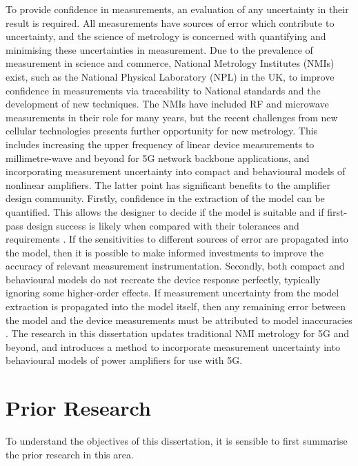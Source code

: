 \documentclass[../thesis/thesis.tex]{subfiles}
\begin{document}
\begin{refsection}
To provide confidence in measurements, an evaluation of any uncertainty in their result is required. All measurements have sources of error which contribute to uncertainty, and the science of metrology is concerned with quantifying and minimising these uncertainties in measurement. Due to the prevalence of measurement in science and commerce, National Metrology Institutes (NMIs) exist, such as the National Physical Laboratory (NPL) in the UK, to improve confidence in measurements via traceability to National standards and the development of new techniques. The NMIs have included RF and microwave measurements in their role for many years, but the recent challenges from new cellular technologies presents further opportunity for new metrology. This includes increasing the upper frequency of linear device measurements to millimetre-wave and beyond for 5G network backbone applications, and incorporating measurement uncertainty into compact and behavioural models of nonlinear amplifiers. The latter point has significant benefits to the amplifier design community. Firstly, confidence in the extraction of the model can be quantified. This allows the designer to decide if the model is suitable and if first-pass design success is likely when compared with their tolerances and requirements \cite{Williams_2016B}. If the sensitivities to different sources of error are propagated into the model, then it is possible to make informed investments to improve the accuracy of relevant measurement instrumentation. Secondly, both compact and behavioural models do not recreate the device response perfectly, typically ignoring some higher-order effects. If measurement uncertainty from the model extraction is propagated into the model itself, then any remaining error between the model and the device measurements must be attributed to model inaccuracies \cite{Cheron_2018}. The research in this dissertation updates traditional NMI metrology for 5G and beyond, and introduces a method to incorporate measurement uncertainty into behavioural models of power amplifiers for use with 5G.

\section{Prior Research}

To understand the objectives of this dissertation, it is sensible to first summarise the prior research in this area.


\end{refsection}
\end{document}
